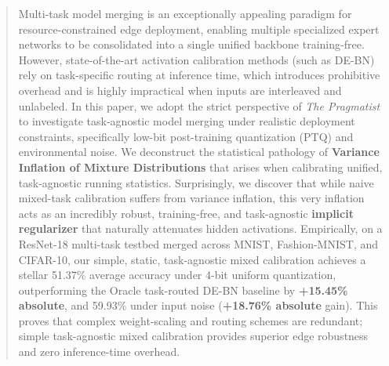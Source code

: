 \documentclass{article}
\theoremstyle{plain}
\theoremstyle{definition}
\theoremstyle{remark}
\begin{document}

\printAffiliationsAndNotice{}

\begin{abstract}
  Multi-task model merging is an exceptionally appealing paradigm for resource-constrained edge deployment, enabling multiple specialized expert networks to be consolidated into a single unified backbone training-free. However, state-of-the-art activation calibration methods (such as DE-BN) rely on task-specific routing at inference time, which introduces prohibitive overhead and is highly impractical when inputs are interleaved and unlabeled. In this paper, we adopt the strict perspective of \textit{The Pragmatist} to investigate task-agnostic model merging under realistic deployment constraints, specifically low-bit post-training quantization (PTQ) and environmental noise. We deconstruct the statistical pathology of \textbf{Variance Inflation of Mixture Distributions} that arises when calibrating unified, task-agnostic running statistics. Surprisingly, we discover that while naive mixed-task calibration suffers from variance inflation, this very inflation acts as an incredibly robust, training-free, and task-agnostic \textbf{implicit regularizer} that naturally attenuates hidden activations. Empirically, on a ResNet-18 multi-task testbed merged across MNIST, Fashion-MNIST, and CIFAR-10, our simple, static, task-agnostic mixed calibration achieves a stellar 51.37\% average accuracy under 4-bit uniform quantization, outperforming the Oracle task-routed DE-BN baseline by \textbf{+15.45\% absolute}, and 59.93\% under input noise (\textbf{+18.76\% absolute} gain). This proves that complex weight-scaling and routing schemes are redundant; simple task-agnostic mixed calibration provides superior edge robustness and zero inference-time overhead.
\end{abstract}
\end{document}
